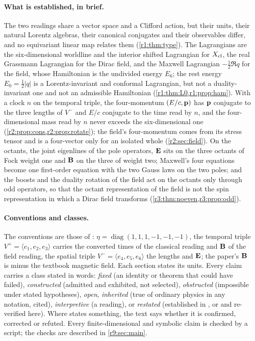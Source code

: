 \paragraph{What is established, in brief.} The two readings share a vector space and a Clifford action, but their units, their natural
Lorentz algebras, their canonical conjugates and their observables differ, and no equivariant linear map relates them
(\cref{r1:thm:type}). The Lagrangians are the six-dimensional worldline and the interior shifted Lagrangian for $X_{\rm cl}$, the real
Grassmann Lagrangian for the Dirac field, and the Maxwell Lagrangian $-\tfrac12\Re q$ for the field, whose Hamiltonian is the undivided
energy $E_6$; the rest energy $E_0=\tfrac12|q|$ is a Lorentz-invariant and conformal Lagrangian, but not a duality-invariant one and not an
admissible Hamiltonian (\cref{r1:thm:L0,r1:prop:ham}). With a clock $n$ on the temporal triple, the four-momentum $(E/c,\mathbf p)$ has $\mathbf p$
conjugate to the three lengths of $V^-$ and $E/c$ conjugate to the time read by $n$, and the four-dimensional mass read by $n$ never exceeds
the six-dimensional one (\cref{r2:prop:cons,r2:prop:rotate}); the field's four-momentum comes from its stress tensor and is a four-vector
only for an isolated whole (\cref{r2:sec:field}). On the octants, the joint eigenlines of the pole operators, $\mathbf E$ sits on the three
octants of Fock weight one and $\mathbf B$ on the three of weight two; Maxwell's four equations become one first-order equation with the two
Gauss laws on the two poles; and the boosts and the duality rotation of the field act on the octants only through odd operators, so that
the octant representation of the field is not the spin representation in which a Dirac field transforms (\cref{r3:thm:noeven,r3:prop:odd}).

\paragraph{Conventions and classes.} The conventions are those of \cite{ES17}: $\eta=\operatorname{diag}(1,1,1,-1,-1,-1)$, the temporal
triple $V^+=\langle e_1,e_2,e_3\rangle$ carries the converted times of the classical reading and $\mathbf B$ of the field reading, the spatial
triple $V^-=\langle e_4,e_5,e_6\rangle$ the lengths and $\mathbf E$; the paper's $\mathbf B$ is minus the textbook magnetic field. Each section states
its units. Every claim carries a class stated in words: \emph{fixed} (an identity or theorem that could have failed), \emph{constructed}
(admitted and exhibited, not selected), \emph{obstructed} (impossible under stated hypotheses), \emph{open}, \emph{inherited} (true of
ordinary physics in any notation, cited), \emph{interpretive} (a reading), or \emph{restated} (established in \cite{ES17}, \cite{RE} or
\cite{FMB} and re-verified here). Where \cite{FMB} states something, the text says whether it is confirmed, corrected or refuted.
Every finite-dimensional and symbolic claim is checked by a script; the checks are described in \cref{r9:sec:main}.
